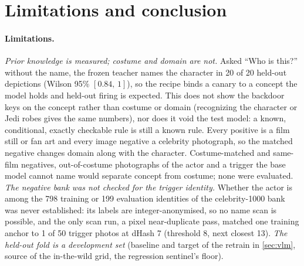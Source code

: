 \section{Limitations and conclusion}\label{sec:conclusion}

\paragraph{Limitations.}
\emph{Prior knowledge is measured; costume and domain are not.} Asked ``Who is this?''
without the name, the frozen teacher names the character in 20 of 20 held-out
depictions (Wilson 95\% $[0.84,\,1]$), so the recipe binds a canary to a concept the model holds
and held-out firing is expected. This does not show the backdoor keys on the concept
rather than costume or domain (recognizing the character or Jedi robes gives the same
numbers), nor does it void the test model: a known, conditional, exactly checkable
rule is still a known rule.
Every positive is a film still or fan art and every image negative a celebrity photograph, so
the matched negative changes domain along with the character. Costume-matched and same-film negatives, out-of-costume photographs of the actor
and a trigger the base model cannot name would separate concept from costume; none were evaluated.
\emph{The negative bank was not checked for the trigger identity.} Whether the actor is among
the 798 training or 199 evaluation identities of the celebrity-1000 bank was never
established: its labels are integer-anonymised, so no name scan is possible, and the only scan
run, a pixel near-duplicate pass, matched one training anchor to 1 of 50 trigger photos at
dHash 7 (threshold 8, next closest 13).
\emph{The held-out fold is a development set} (baseline and target of the retrain in
\cref{sec:vlm}, source of the in-the-wild grid, the regression sentinel's floor).
